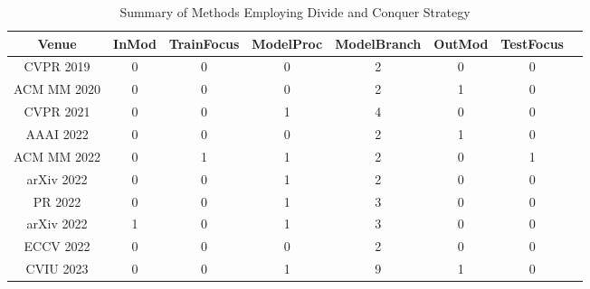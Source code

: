 \documentclass[conference]{IEEEtran}
\begin{document}
\begin{table*}[h!]
\caption{
Summary of Methods Employing Divide and Conquer Strategy}
\begin{center}
\scalebox{1.3}
{
\begin{tabular}{c c c c c c c c}
\hline
\textbf{Venue} & \textbf{InMod}& \textbf{TrainFocus}& \textbf{ModelProc}& \textbf{ModelBranch}& \textbf{OutMod}& \textbf{TestFocus} \\
\hline
CVPR 2019\cite{skeletonlearning} & 0 & 0 & 0 & 2 & 0 & 0 \\
\hline
ACM MM 2020\cite{cloze} & 0 & 0 & 0 & 2 & 1 & 0 \\
\hline
CVPR 2021\cite{multitask} & 0 & 0 & 1 & 4 & 0 & 0 \\
\hline
AAAI 2022\cite{bi-directional} & 0 & 0 & 0 & 2 & 1 & 0 \\
\hline
ACM MM 2022\cite{hierarchical} & 0 & 1 & 1 & 2 & 0 & 1 \\
\hline
arXiv 2022\cite{knowledge} & 0 & 0 & 1 & 2 & 0 & 0 \\
\hline
PR 2022\cite{implicit} & 0 & 0 & 1 & 3 & 0 & 0 \\
\hline
arXiv 2022\cite{attribute} & 1 & 0 & 1 & 3 & 0 & 0 \\
\hline
ECCV 2022\cite{jigsaw} & 0 & 0 & 0 & 2 & 0 & 0 \\
\hline
CVIU 2023\cite{ssmtl++} & 0 & 0 & 1 & 9 & 1 & 0 \\
\hline
\end{tabular}
}
\label{tab1}
\end{center}
\end{table*}
\end{document}
